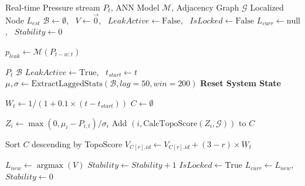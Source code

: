 \documentclass[final,5p,times,twocolumn,authoryear]{elsarticle}
\begin{document}
\begin{algorithm}[htbp]
\caption{Real-Time Physics-Aware Localization Strategy}
\label{alg:leak_localization}
\begin{algorithmic}[1]
\Require Real-time Pressure stream $P_t$, ANN Model $\mathcal{M}$, Adjacency Graph $\mathcal{G}$
\Ensure Localized Node $L_{est}$
\State $\mathcal{B} \leftarrow \emptyset$, \ $V \leftarrow \vec{0}$, \ $LeakActive \leftarrow \text{False}$, \ $IsLocked \leftarrow \text{False}$
\State $L_{curr} \leftarrow \text{null}$, \ $Stability \leftarrow 0$

    \State $p_{leak} \leftarrow \mathcal{M}(P_{t-w:t})$ 
    
          $P_t$  $\mathcal{B}$ \EndIf
            \State $LeakActive \leftarrow \text{True}$, \ $t_{start} \leftarrow t$
            \State $\mu, \sigma \leftarrow \text{ExtractLaggedStats}(\mathcal{B}, lag=50, win=200)$
        \EndIf
    \Else
         \textbf{Reset System State} \EndIf
        
            \State $W_t \leftarrow 1 / (1 + 0.1 \times (t - t_{start}))$
            \State $C \leftarrow \emptyset$ 
            
                \State $Z_i \leftarrow \max(0, \mu_i - P_{i,t}) / \sigma_i$
                    \State Add $(i, \text{CalcTopoScore}(Z_i, \mathcal{G}))$ to $C$
                \EndIf
            \EndFor
            
            \State Sort $C$ descending by TopoScore
                \State $V_{C[r].id} \leftarrow V_{C[r].id} + (3 - r) \times W_t$
            \EndFor
            
            \State $L_{new} \leftarrow \operatorname*{argmax}(V)$
                \State $Stability \leftarrow Stability + 1$
                 $IsLocked \leftarrow \text{True}$ \EndIf
            \Else
                \State $L_{curr} \leftarrow L_{new}$, \ $Stability \leftarrow 0$
            \EndIf
        \EndIf
    \EndIf
\EndWhile
\end{algorithmic}
\end{algorithm}
\end{document}
